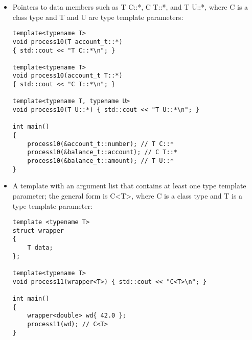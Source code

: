 \begin{itemize}
\begin{lstlisting}[style=styleCXX]
template<typename T, typename U>
void process09(transaction_t(T::*)(U))
{ std::cout << "C (T::*)(U)\n"; }

template<typename T>
void process09(balance_report_t(balance_t::*)(T))
{ std::cout << "D (C::*)(T)\n"; }

int main()
{
	int (account_t::* pfm1)() = &account_t::get_number;
	int (account_t::* pfm2)(std::string) =
		&account_t::from_string;
	int (balance_t::* pfm3)() =
		&balance_t::get_account_number;
	bool (balance_t::* pfm4)(double) =
		&balance_t::can_withdraw;
	account_t (balance_t::* pfm5)() =
		&balance_t::get_account;
	transaction_t(balance_t::* pfm6)(double) =
		&balance_t::withdraw;
	balance_report_t(balance_t::* pfm7)(int) =
		&balance_t::make_report;
		
	process09(pfm1); // T (C::*)()
	process09(pfm2); // T (C::*)(U)
	process09(pfm3); // T (U::*)()
	process09(pfm4); // T (U::*)(V)
	process09(pfm5); // C (T::*)()
	process09(pfm6); // C (T::*)(U)
	process09(pfm7); // D (C::*)(T)
}
\end{lstlisting}

\item
Pointers to data members such as T C::*, C T::*, and T U::*, where C is a class type and T and U are type template parameters:

\begin{lstlisting}[style=styleCXX]
template<typename T>
void process10(T account_t::*)
{ std::cout << "T C::*\n"; }

template<typename T>
void process10(account_t T::*)
{ std::cout << "C T::*\n"; }

template<typename T, typename U>
void process10(T U::*) { std::cout << "T U::*\n"; }

int main()
{
	process10(&account_t::number); // T C::*
	process10(&balance_t::account); // C T::*
	process10(&balance_t::amount); // T U::*
}
\end{lstlisting}

\item
A template with an argument list that contains at least one type template parameter; the general form is C<T>, where C is a class type and T is a type template parameter:

\begin{lstlisting}[style=styleCXX]
template <typename T>
struct wrapper
{
	T data;
};

template<typename T>
void process11(wrapper<T>) { std::cout << "C<T>\n"; }

int main()
{
	wrapper<double> wd{ 42.0 };
	process11(wd); // C<T>
}
\end{lstlisting}


\end{itemize}
